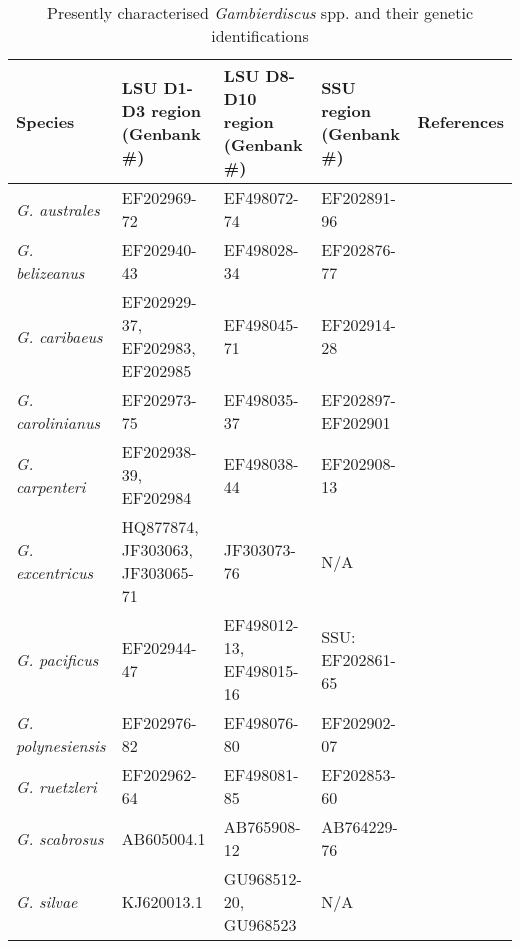 \documentclass[12pt]{article}
\begin{document}
\FloatBarrier
\begin{longtable}{ |  p{2.2cm} | p{2.8cm} | p{2.8cm} | p{2.8cm} | p{2.6cm} | }
\caption{Presently characterised \emph{Gambierdiscus} spp. and their genetic identifications}\\
\hline
\label{tbl:MorphTable}
\textbf{Species} & \textbf{LSU D1-D3 region (Genbank \#)} & \textbf{LSU D8-D10 region (Genbank \#)} & \textbf{SSU region (Genbank \#)} & \textbf{References} \\
\hline
 \emph{G. australes} & EF202969-72 & EF498072-74  & EF202891-96 & \cite{chinain1999morphology,litaker2009taxonomy} \\
\hline
 \emph{G. belizeanus} & EF202940-43 &  EF498028-34 & EF202876-77  & \cite{litaker2009taxonomy,faust1995observation} \\
\hline
 \emph{G. caribaeus} & EF202929-37, EF202983, EF202985 &  EF498045-71  & EF202914-28 & \cite{litaker2009taxonomy} \\
\hline
 \emph{G. carolinianus} &  EF202973-75 & EF498035-37 & EF202897-EF202901  & \cite{litaker2009taxonomy} \\
\hline
 \emph{G. carpenteri} &  EF202938-39, EF202984 & EF498038-44  & EF202908-13   & \cite{litaker2009taxonomy} \\
\hline
  \emph{G. excentricus} &  HQ877874, JF303063, JF303065-71 & JF303073-76 & N/A & \cite{litaker2009taxonomy} \\
\hline
  \emph{G. pacificus} &  EF202944-47 &  EF498012-13, EF498015-16 & SSU: EF202861-65  & \cite{litaker2009taxonomy,chinain1999morphology} \\
\hline
 \emph{G. polynesiensis} &  EF202976-82 & EF498076-80 & EF202902-07& \cite{litaker2009taxonomy,chinain1999morphology} \\
\hline 
 \emph{G. ruetzleri} &  EF202962-64 & EF498081-85 & EF202853-60 & \cite{litaker2009taxonomy} \\
 \hline
 \emph{G. scabrosus} &  AB605004.1 & AB765908-12  & AB764229-76 & \cite{nishimura2013genetic,nishimura2014morphology,kuno2010genetic} \\ 
\hline
\emph{G. silvae} &  KJ620013.1 & GU968512-20, GU968523 & N/A & \cite{litaker2010global,fraga2014genus} \\

\end{longtable}
\end{document}
